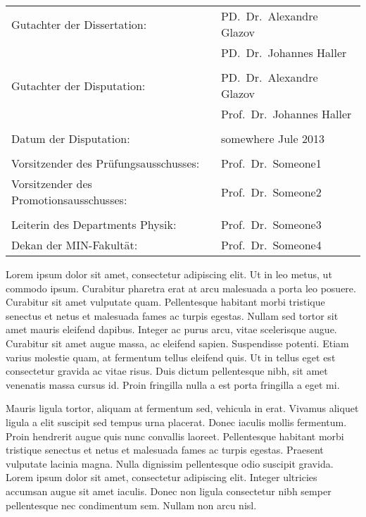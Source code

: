 \documentclass[oneside,11pt]{Classes/PhDthesisPSnPDF}
\begin{document}

\newpage
\thispagestyle{empty}
\vspace{12mm}
\begin{tabular}{ll}
Gutachter der Dissertation: & PD.~Dr.~Alexandre Glazov \\
                            & PD.~Dr.~Johannes Haller \\
    \\
Gutachter der Disputation:  & PD.~Dr.~Alexandre Glazov \\
							& Prof.~Dr.~Johannes Haller \\
                            
    \\
Datum der Disputation: & somewhere Jule 2013 \\
\\
Vorsitzender des Pr\"ufungsausschusses: & Prof.~Dr.~Someone1 \\
Vorsitzender des Promotionsausschusses: & Prof.~Dr.~Someone2 \\
    \\
Leiterin des Departments Physik:        & Prof.~Dr.~Someone3 \\
Dekan der MIN-Fakult\"at:               & Prof.~Dr.~Someone4
\end{tabular}


\begin{abstracts}
 Lorem ipsum dolor sit amet, consectetur adipiscing elit. Ut in leo metus, ut commodo ipsum. Curabitur pharetra erat at arcu malesuada a porta leo posuere. Curabitur sit amet vulputate quam. Pellentesque habitant morbi tristique senectus et netus et malesuada fames ac turpis egestas. Nullam sed tortor sit amet mauris eleifend dapibus. Integer ac purus arcu, vitae scelerisque augue. Curabitur sit amet augue massa, ac eleifend sapien. Suspendisse potenti. Etiam varius molestie quam, at fermentum tellus eleifend quis. Ut in tellus eget est consectetur gravida ac vitae risus. Duis dictum pellentesque nibh, sit amet venenatis massa cursus id. Proin fringilla nulla a est porta fringilla a eget mi.

Mauris ligula tortor, aliquam at fermentum sed, vehicula in erat. Vivamus aliquet ligula a elit suscipit sed tempus urna placerat. Donec iaculis mollis fermentum. Proin hendrerit augue quis nunc convallis laoreet. Pellentesque habitant morbi tristique senectus et netus et malesuada fames ac turpis egestas. Praesent vulputate lacinia magna. Nulla dignissim pellentesque odio suscipit gravida. Lorem ipsum dolor sit amet, consectetur adipiscing elit. Integer ultricies accumsan augue sit amet iaculis. Donec non ligula consectetur nibh semper pellentesque nec condimentum sem. Nullam non arcu nisl. 
\end{abstracts}	
\end{document}
